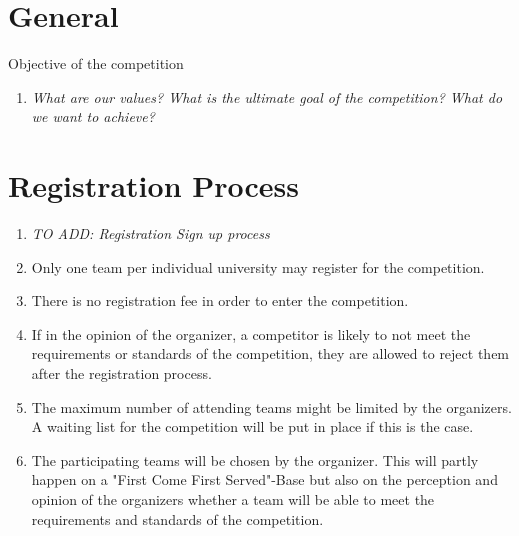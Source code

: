 

 \section{General}
  
    Objective of the competition
    \begin{enumerate}
      \item \emph{What are our values? What is the ultimate goal of the competition? What do we want to achieve?}
    \end{enumerate}

  \section{Registration Process}
      \begin{enumerate}
        \item \emph{TO ADD: Registration Sign up process}
        \item Only one team per individual university may register for the competition.  
        \item There is no registration fee in order to enter the competition. 
        \item If in the opinion of the organizer, a competitor is likely to not meet the requirements or standards
        of the competition, they are allowed to reject them after the registration process. 
        \item The maximum number of attending teams might be limited by the organizers. A waiting list for the competition
        will be put in place if this is the case. 
        \item The participating teams will be chosen by the organizer. This will partly happen on a "First Come First Served"-Base but also
        on the perception and opinion of the organizers whether a team will be able to meet the requirements and standards of the competition. 
      \end{enumerate}

